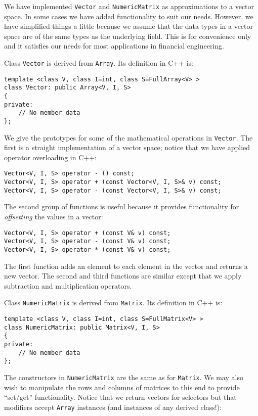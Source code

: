 We have implemented \texttt{Vector} and \texttt{NumericMatrix} as approximations to a vector space. In some cases we have added functionality to suit our needs. However, we have simplified things a little because we assume that the data types in a vector space are of the same types as the underlying field. This is for convenience only and it satisfies our needs for most applications in financial engineering.

Class \texttt{Vector} is derived from \texttt{Array}. Its definition in C++ is:

\begin{lstlisting}
template <class V, class I=int, class S=FullArray<V> >
class Vector: public Array<V, I, S>
{
private:
	// No member data
};
\end{lstlisting}

We give the prototypes for some of the mathematical operations in \texttt{Vector}. The first is a straight implementation of a vector space; notice that we have applied operator overloading in C++:

\begin{lstlisting}
Vector<V, I, S> operator - () const;
Vector<V, I, S> operator + (const Vector<V, I, S>& v) const;
Vector<V, I, S> operator - (const Vector<V, I, S>& v) const;
\end{lstlisting}
The second group of functions is useful because it provides functionality for \textit{offsetting} the values in a vector:
\begin{lstlisting}
Vector<V, I, S> operator + (const V& v) const;
Vector<V, I, S> operator - (const V& v) const;
Vector<V, I, S> operator * (const V& v) const;
\end{lstlisting}
The first function adds an element to each element in the vector and returns a new vector. The second and third functions are similar except that we apply subtraction and multiplication operators.

Class \texttt{NumericMatrix} is derived from \texttt{Matrix}. Its definition in C++ is:

\begin{lstlisting}
template <class V, class I=int, class S=FullMatrix<V> >
class NumericMatrix: public Matrix<V, I, S>
{
private:
	// No member data
};
\end{lstlisting}
The constructors in \texttt{NumericMatrix} are the same as for \texttt{Matrix}. We may also wish to manipulate the rows and columns of matrices to this end to provide ``set/get'' functionality. Notice that we return vectors for selectors but that modifiers accept \texttt{Array} instances (and instances of any derived class!):


